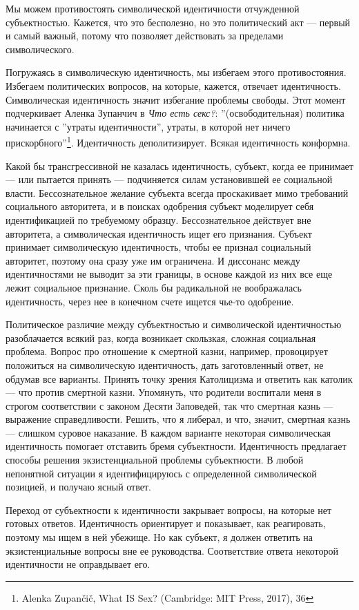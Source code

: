 \documentclass[12pt]{book}
\begin{document}
Мы можем противостоять символической идентичности отчужденной субъектностью. Кажется, что это бесполезно, но это политический акт --- первый и самый важный, потому что позволяет действовать за пределами символического.

Погружаясь в символическую идентичность, мы избегаем этого противостояния. Избегаем политических вопросов, на которые, кажется, отвечает идентичность. Символическая идентичность значит избегание проблемы свободы. Этот момент подчеркивает Аленка Зупанчич в \textit{Что есть секс?}: ''(освободительная) политика начинается с ''утраты идентичности'', утраты, в которой нет ничего прискорбного''\footnote{Alenka Zupančič, What IS Sex? (Cambridge: MIT Press, 2017), 36}. Идентичность деполитизирует. Всякая идентичность конформна.

Какой бы трансгрессивной не казалась идентичность, субъект, когда ее принимает --- или пытается принять --- подчиняется силам установившей ее социальной власти. Бессознательное желание субъекта всегда проскакивает мимо требований социального авторитета, и в поисках одобрения субъект моделирует себя идентификацией по требуемому образцу. Бессознательное действует вне авторитета, а символическая идентичность ищет его признания. Субъект принимает символическую идентичность, чтобы ее признал социальный авторитет, поэтому она сразу уже им ограничена. И диссонанс между идентичностями не выводит за эти границы, в основе каждой из них все еще лежит социальное признание. Сколь бы радикальной не воображалась идентичность, через нее в конечном счете ищется чье-то одобрение.

Политическое различие между субъектностью и символической идентичностью разоблачается всякий раз, когда возникает скользкая, сложная социальная проблема. Вопрос про отношение к смертной казни, например, провоцирует положиться на символическую идентичность, дать заготовленный ответ, не обдумав все варианты. Принять точку зрения Католицизма и ответить как католик --- что против смертной казни. Упомянуть, что родители воспитали меня в строгом соответствии с законом Десяти Заповедей, так что смертная казнь --- выражение справедливости. Решить, что я либерал, и что, значит, смертная казнь --- слишком суровое наказание. В каждом варианте некоторая символическая идентичность помогает отставить бремя субъектности. Идентичность предлагает способы решения экзистенциальной проблемы субъектности. В любой непонятной ситуации я идентифицируюсь с определенной символической позицией, и получаю ясный ответ.

Переход от субъектности к идентичности закрывает вопросы, на которые нет готовых ответов. Идентичность ориентирует и показывает, как реагировать, поэтому мы ищем в ней убежище. Но как субъект, я должен ответить на экзистенциальные вопросы вне ее руководства. Соответствие ответа некоторой идентичности не оправдывает его.
\end{document}
